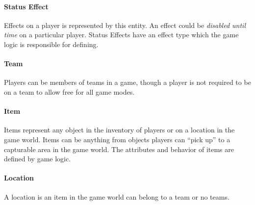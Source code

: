 \paragraph{Status Effect}
Effects on a player is represented by this entity. An effect could be \textit{disabled until time} on a particular player. Status Effects have an effect type which the game logic is responsible for defining.

\paragraph{Team}
Players can be members of teams in a game, though a player is not required to be on a team to allow free for all game modes.


\paragraph{Item}
Items represent any object in the inventory of players or on a location in the game world. Items can be anything from objects players can ``pick up'' to a capturable area in the game world. The attributes and behavior of items are defined by game logic.

\paragraph{Location}
A location is an item in the game world can belong to a team or no teams.




